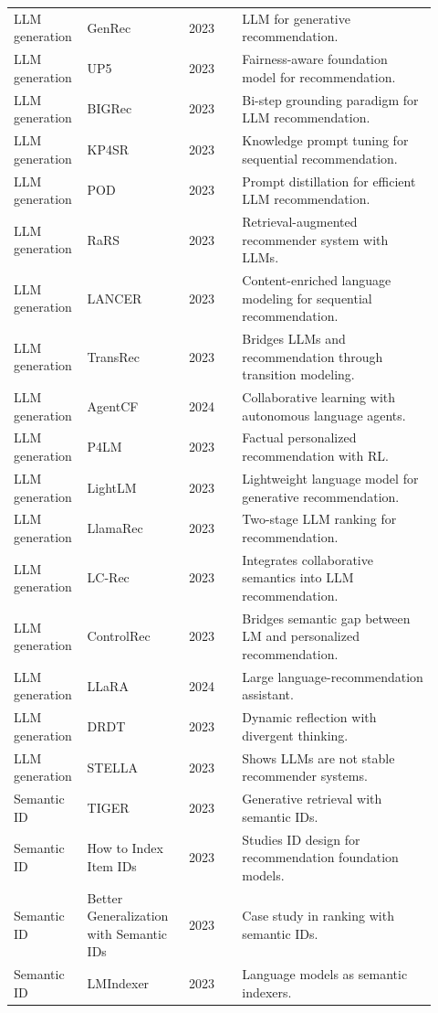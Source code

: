 \documentclass[11pt]{article}
\begin{document}
\begin{longtable}{@{}p{0.13\linewidth}p{0.23\linewidth}p{0.12\linewidth}p{0.44\linewidth}@{}}
LLM generation & GenRec & 2023 & LLM for generative recommendation.\\
LLM generation & UP5 & 2023 & Fairness-aware foundation model for recommendation.\\
LLM generation & BIGRec & 2023 & Bi-step grounding paradigm for LLM recommendation.\\
LLM generation & KP4SR & 2023 & Knowledge prompt tuning for sequential recommendation.\\
LLM generation & POD & 2023 & Prompt distillation for efficient LLM recommendation.\\
LLM generation & RaRS & 2023 & Retrieval-augmented recommender system with LLMs.\\
LLM generation & LANCER & 2023 & Content-enriched language modeling for sequential recommendation.\\
LLM generation & TransRec & 2023 & Bridges LLMs and recommendation through transition modeling.\\
LLM generation & AgentCF & 2024 & Collaborative learning with autonomous language agents.\\
LLM generation & P4LM & 2023 & Factual personalized recommendation with RL.\\
LLM generation & LightLM & 2023 & Lightweight language model for generative recommendation.\\
LLM generation & LlamaRec & 2023 & Two-stage LLM ranking for recommendation.\\
LLM generation & LC-Rec & 2023 & Integrates collaborative semantics into LLM recommendation.\\
LLM generation & ControlRec & 2023 & Bridges semantic gap between LM and personalized recommendation.\\
LLM generation & LLaRA & 2024 & Large language-recommendation assistant.\\
LLM generation & DRDT & 2023 & Dynamic reflection with divergent thinking.\\
LLM generation & STELLA & 2023 & Shows LLMs are not stable recommender systems.\\
Semantic ID & TIGER & 2023 & Generative retrieval with semantic IDs.\\
Semantic ID & How to Index Item IDs & 2023 & Studies ID design for recommendation foundation models.\\
Semantic ID & Better Generalization with Semantic IDs & 2023 & Case study in ranking with semantic IDs.\\
Semantic ID & LMIndexer & 2023 & Language models as semantic indexers.\\

\end{longtable}
\end{document}

